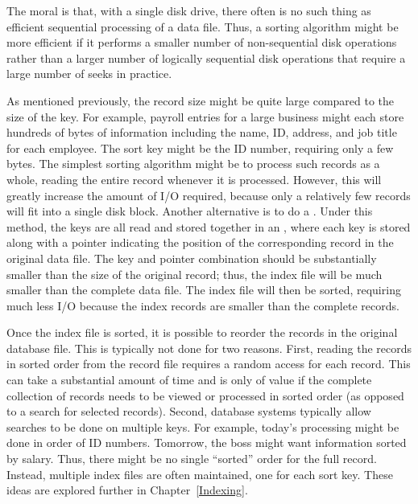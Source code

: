 
The moral is that, with a single disk drive, there often is
no such thing as efficient sequential processing of a data file.
Thus, a sorting algorithm might be more efficient if it performs a
smaller number of non-sequential disk operations rather than a larger
number of logically sequential disk operations that require a large
number of seeks in practice.

As mentioned previously, the record size might be quite large compared
to the size of the key.
For example, payroll entries for a large business might each store
hundreds of bytes of information including the name, ID, address, and
job title for each employee.
The sort key might be the ID number, requiring only a few bytes.
The simplest sorting algorithm might be to process such records as a
whole, reading the entire record whenever it is processed.
However, this will greatly increase the amount of I/O required,
because only a relatively few records will fit into a single disk
block.
Another alternative is to do a .
Under this method, the keys are all read and stored together in an
, where each key is stored along
with a pointer indicating the position of the corresponding record in
the original data file.
The key and pointer combination should be substantially smaller than
the size of the original record; thus, the index file will be much
smaller than the complete data file.
The index file will then be sorted, requiring much less I/O because
the index records are smaller than the complete records.

Once the index file is sorted, it is possible to reorder the records
in the original database file.
This is typically not done for two reasons.
First, reading the records in sorted order from the record file
requires a random access for each record.
This can take a substantial amount of time and is only of value if
the complete collection of records needs to be viewed or processed in
sorted order (as opposed to a search for selected records).
Second, database systems typically allow searches to be
done on multiple keys.
For example, today's processing might be done in order of ID numbers.
Tomorrow, the boss might want information sorted by salary.
Thus, there might be no single ``sorted'' order for the full record.
Instead, multiple index files are often maintained, one for each sort
key.
These ideas are explored further in Chapter~\ref{Indexing}.


